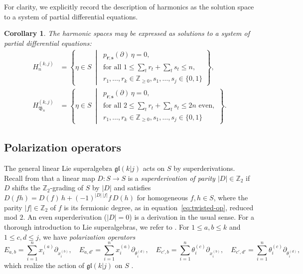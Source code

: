 \documentclass[12pt]{amsart}
\theoremstyle{plain}
\newtheorem{corollary}[theorem]{Corollary}
\theoremstyle{definition}
\newcommand{\Z}{\mathbb{Z}}
\begin{document}
For clarity, we explicitly record the description of harmonics as the solution space to a system of partial differential equations. 
\begin{corollary}\label{cor:harmonics-explicit}
The harmonic spaces may be expressed as solutions to a system of partial differential equations:
\begin{align}
    H_n^{(k,j)}
        &= \left\{ \eta \in S \ \middle|\ 
        \begin{array}{l}
              p_{\bm{r};\bm{s}}(\partial)\,\eta = 0, \\
              \text{for all } 1 \leq \textstyle\sum_t r_t + \sum_t s_t \leq n,\\ 
              r_1,\ldots,r_k \in \Z_{\geq 0}, s_1,\ldots,s_j \in \{0,1\} 
            \label{eq:harm-A}
        \end{array}
        \right\},\\
    H_{\mathfrak{B}_n}^{(k,j)}
        &= \left\{ \eta \in S \ \middle|\ 
        \begin{array}{l}
             p_{\bm{r};\bm{s}}(\partial)\,\eta = 0,  \\
             \text{for all } 2 \leq \textstyle\sum_t r_t + \sum_t s_t \leq 2n \text{ even},\\ 
             r_1,\ldots,r_k \in \Z_{\geq 0}, s_1,\ldots,s_j \in \{0,1\}
        \end{array}
              \right\}.
            \label{eq:harm-B}
\end{align}
\end{corollary}

\subsection{Polarization operators}\label{subsec:polarization}

The general linear Lie superalgebra $\mathfrak{gl}(k|j)$ acts on $S$ by superderivations. 
Recall from \cite[Section 1.1]{ChengWangBook} that a linear map $D \colon S \to S$ is a \emph{superderivation of parity $|D| \in \Z_2$} if $D$ shifts the $\Z_2$-grading of $S$ by $|D|$ and satisfies $D(fh) = D(f)\,h + (-1)^{|D|\,|f|} f\, D(h)$ for homogeneous $f, h \in S$, where the parity $|f| \in \Z_2$ of $f$ is its fermionic degree, as in equation~\eqref{eq:twisted-op}, reduced mod $2$.
An even superderivation ($|D| = 0$) is a derivation in the usual sense.
For a thorough introduction to Lie superalgebras, we refer to \cite{ChengWangBook}.
For $1 \leq a,b \leq k$ and $1 \leq c,d \leq j$, we have \emph{polarization operators}
\begin{equation}\label{eq:superderivations}
    E_{a,b} = \sum_{i=1}^n x_i^{(a)} \partial_{x_i^{(b)}},\quad
    E_{a,d'} = \sum_{i=1}^n x_i^{(a)} \partial_{\theta_i^{(d)}},\quad
    E_{c',b} = \sum_{i=1}^n \theta_i^{(c)} \partial_{x_i^{(b)}},\quad
    E_{c',d'} = \sum_{i=1}^n \theta_i^{(c)} \partial_{\theta_i^{(d)}},
\end{equation}
which realize the action of $\mathfrak{gl}(k|j)$ on $S$ \cite[Lemma 5.13]{ChengWangBook}. 
\end{document}
